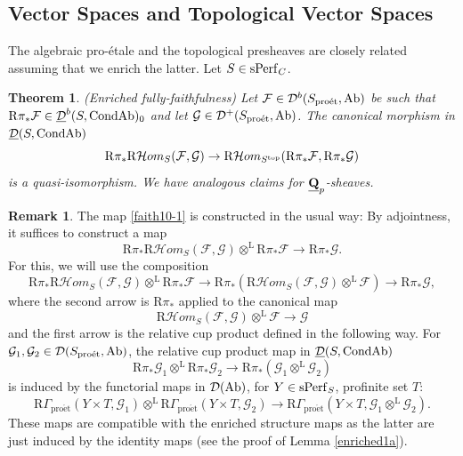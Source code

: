 \documentclass[10pt]{amsart}
\let\cal\mathcal
\newtheorem{theorem}[equation]{Theorem}
\theoremstyle{definition}
\newtheorem{remark}[equation]{Remark}
\theoremstyle{remark}
\newcommand{\proeet}{\operatorname{pro\acute{e}t} }
\newcommand{\Hhom}{{\cal Hom}}
\newcommand{\LL}{\operatorname{L} }
\newcommand{\sff}{{\mathcal{F}}}
\newcommand{\sg}{{\mathcal{G}}}
\newcommand{\sd}{{\mathcal{D}}}
\numberwithin{equation}{section}
\def\R{{\mathrm R}}
\def\Q{{\bf Q}} \def\Z{{\bf Z}}
\numberwithin{equation}{section}
\begin{document}
\subsection{Vector Spaces  and Topological Vector Spaces} The algebraic  pro-\'etale and the  topological  presheaves are  closely related assuming that we enrich the latter. Let $S\in {\rm sPerf}_C$. 
\begin{theorem}{\rm(Enriched fully-faithfulness)} \label{duck1}  Let $\sff\in \sd^b(S_{\proeet},{\rm Ab})$ be such that $\R\pi_*\sff\in \underline{\sd}^b(S,{\rm CondAb})_0$ and 
let $\sg\in \sd^+(S_{\proeet},{\rm Ab})$.  The canonical morphism in $\underline{\sd}(S,{\rm CondAb})$
\begin{equation}\label{faith10-1}
\R\pi_*\R\Hhom_{S}(\sff,\sg)\to \R\Hhom_{S^{\rm top}}(\R\pi_*\sff,\R\pi_*\sg)
\end{equation}
is a quasi-isomorphism.  We  have  analogous claims for  $\underline{\Q}_p$-sheaves.
\end{theorem}
\begin{remark}\label{maybe10} The map \eqref{faith10-1}  is    constructed in the usual way: 
By adjointness, it suffices to construct a map
$$
\R\pi_*\R\Hhom_{S}(\sff,\sg)\otimes^{\LL}\R\pi_*\sff\to \R\pi_*\sg.
$$
For this, we will use the composition 
$$
\R\pi_*\R\Hhom_{S}(\sff,\sg)\otimes^{\LL}\R\pi_*\sff\to \R\pi_*(\R\Hhom_{S}(\sff,\sg)\otimes^{\LL}\sff)\to\R\pi_*\sg,
$$
where  the second arrow is $\R\pi_*$ applied to the canonical map
$$
\R\Hhom_{S}(\sff,\sg)\otimes^{\LL}\sff\to \sg
$$
and the first arrow is the relative cup product defined in the following way. For  $\sg_1,\sg_2\in \sd(S_{\proeet}, {\rm Ab})$, 
 the relative cup product map in $\underline{\sd}(S, {\rm CondAb})$
$$
\R\pi_*\sg_1\otimes^{\LL}\R\pi_*\sg_2\to \R\pi_*(\sg_1\otimes^{\LL}\sg_2)
$$
is induced by the functorial maps  in $\sd({\rm Ab})$, for $Y\in {\rm sPerf}_S$, profinite set $T$: 
\begin{equation}\label{maybe40}
\R\Gamma_{\proeet}(Y\times T,\sg_1)\otimes^{\LL}\R\Gamma_{\proeet}(Y\times T,\sg_2)\to \R\Gamma_{\proeet}(Y\times T,\sg_1\otimes^{\LL} \sg_2).
\end{equation}
These maps are compatible with the enriched structure maps as the latter are just induced by the identity maps (see the proof of Lemma \ref{enriched1a}).
\end{remark}
\end{document}
